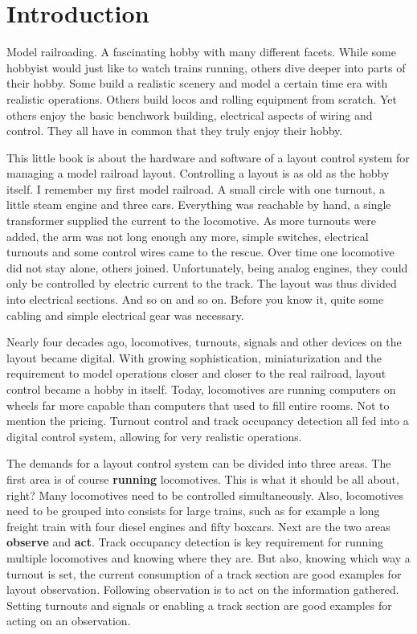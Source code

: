 \chapter*{Introduction}

Model railroading. A fascinating hobby with many different facets. While some hobbyist would just like to watch trains running, others dive deeper into parts of their hobby. Some build a realistic scenery and model a certain time era with realistic operations. Others build locos and rolling equipment from scratch. Yet others enjoy the basic benchwork building, electrical aspects of wiring and control. They all have in common that they truly enjoy their hobby.

This little book is about the hardware and software of a layout control system for managing a model railroad layout. Controlling a layout is as old as the hobby itself. I remember my first model railroad. A small circle with one turnout, a little steam engine and three cars. Everything was reachable by hand, a single transformer supplied the current to the locomotive. As more turnouts were added, the arm was not long enough any more, simple switches, electrical turnouts and some control wires came to the rescue. Over time one locomotive did not stay alone, others joined. Unfortunately, being analog engines, they could only be controlled by electric current to the track. The layout was thus divided into electrical sections. And so on and so on. Before you know it, quite some cabling and simple electrical gear was necessary.

Nearly four decades ago, locomotives, turnouts, signals and other devices on the layout became digital. With growing sophistication, miniaturization and the requirement to model operations closer and closer to the real railroad, layout control became a hobby in itself. Today, locomotives are running computers on wheels far more capable than computers that used to fill entire rooms. Not to mention the pricing. Turnout control and track occupancy detection all fed into a digital control system, allowing for very realistic operations.

The demands for a layout control system can be divided into three areas. The first area is of course {\bf running} locomotives. This is what it should be all about, right? Many locomotives need to be controlled simultaneously. Also, locomotives need to be grouped into consists for large trains, such as for example a long freight train with four diesel engines and fifty boxcars. Next are the two areas {\bf observe} and {\bf act}. Track occupancy detection is key requirement for running multiple locomotives and knowing where they are. But also, knowing which way a turnout is set, the current consumption of a track section are good examples for layout observation. Following observation is to act on the information gathered. Setting turnouts and signals or enabling a track section are good examples for acting on an observation.

